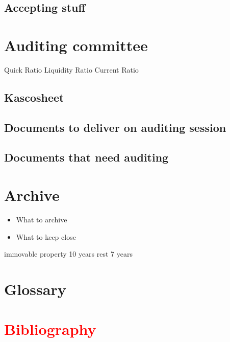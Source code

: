 \documentclass{report}
\begin{document}
\subsection{Accepting stuff}
\section{Auditing committee}
Quick Ratio
Liquidity Ratio
Current Ratio
\subsection{Kascosheet}
\subsection{Documents to deliver on auditing session}
\subsection{Documents that need auditing}
\section{Archive}
\begin{itemize}
	\item What to archive
	\item What to keep close
\end{itemize}
immovable property 10 years
rest 7 years
\section{Glossary}
\section{\textcolor{red}{Bibliography}}
\end{document}
